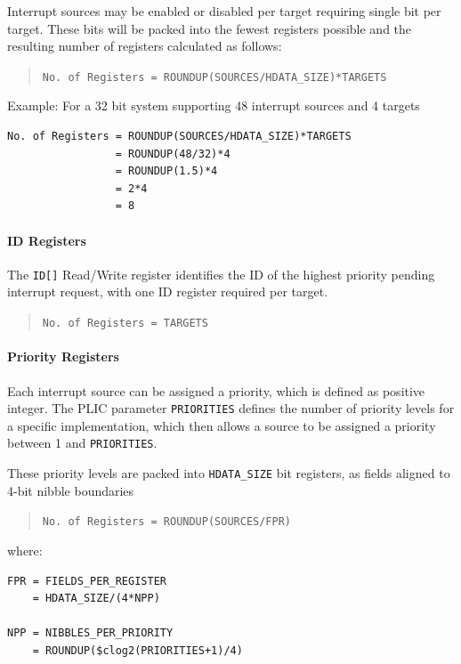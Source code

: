 \documentclass[]{article}
\begin{document}
Interrupt sources may be enabled or disabled per target requiring single
bit per target. These bits will be packed into the fewest registers
possible and the resulting number of registers calculated as follows:

\begin{quote}
\texttt{No.\ of\ Registers\ =\ ROUNDUP(SOURCES/HDATA\_SIZE)*TARGETS}
\end{quote}

Example: For a 32 bit system supporting 48 interrupt sources and 4
targets

\begin{verbatim}
No. of Registers = ROUNDUP(SOURCES/HDATA_SIZE)*TARGETS
                 = ROUNDUP(48/32)*4
                 = ROUNDUP(1.5)*4
                 = 2*4
                 = 8
\end{verbatim}

\paragraph{ID Registers}

The \texttt{ID[]} Read/Write
register identifies the ID of the highest priority pending interrupt
request, with one ID register required per target.

\begin{quote}
\texttt{No.\ of\ Registers\ =\ TARGETS}
\end{quote}

\paragraph{Priority Registers}

Each interrupt source can be assigned a priority, which is defined as
positive integer. The PLIC parameter \texttt{PRIORITIES} defines the
number of priority levels for a specific implementation, which then
allows a source to be assigned a priority between 1 and
\texttt{PRIORITIES}.

These priority levels are packed into
\texttt{HDATA\_SIZE} bit registers, as fields aligned to
4-bit nibble boundaries

\begin{quote}
\texttt{No.\ of\ Registers\ =\ ROUNDUP(SOURCES/FPR)}
\end{quote}

where:

\begin{verbatim}
FPR = FIELDS_PER_REGISTER
    = HDATA_SIZE/(4*NPP)

NPP = NIBBLES_PER_PRIORITY
    = ROUNDUP($clog2(PRIORITIES+1)/4)
\end{verbatim}
\end{document}
